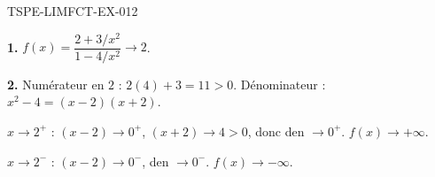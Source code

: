 \begin{corrige}{TSPE-LIMFCT-EX-012}

\textbf{1.} $f(x) = \dfrac{2+3/x^2}{1-4/x^2} \to \boxed{2}$.

\textbf{2.} Numérateur en $2$ : $2(4)+3 = 11 > 0$. Dénominateur : $x^2-4 = (x-2)(x+2)$.

$x \to 2^+$ : $(x-2) \to 0^+$, $(x+2) \to 4 > 0$, donc den $\to 0^+$. $\boxed{f(x) \to +\infty}$.

$x \to 2^-$ : $(x-2) \to 0^-$, den $\to 0^-$. $\boxed{f(x) \to -\infty}$.

\end{corrige}
